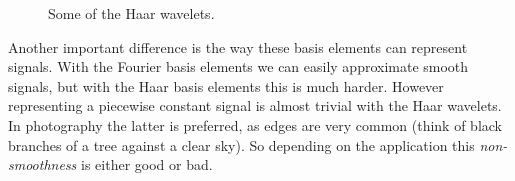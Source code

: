 \begin{figure}
	\centering
	\caption{Some of the Haar wavelets.}
	\label{fig:haarwvlt}
\end{figure}

Another important difference is the way these basis elements can represent signals. With the Fourier basis elements we can easily approximate smooth signals, but with the Haar basis elements this is much harder. However representing a piecewise constant signal is almost trivial with the Haar wavelets. In photography the latter is preferred, as edges are very common (think of black branches of a tree against a clear sky). So depending on the application this \emph{non-smoothness} is either good or bad.
